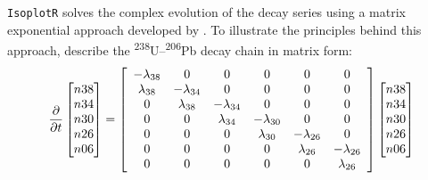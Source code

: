 \begin{refsection}
\texttt{IsoplotR} solves the complex evolution of the decay series
using a matrix exponential approach developed by \citet{mclean2016}.
To illustrate the principles behind this approach, describe the
\textsuperscript{238}U--\textsuperscript{206}Pb decay chain in matrix
form:
\begin{equation}
  \frac{\partial}{\partial{t}}\left[
    \begin{array}{@{}c@{}}
      n38\\
      n34\\
      n30\\
      n26\\
      n06
    \end{array}
  \right]
  =
  \left[
    \begin{array}{cccccc}
      -\lambda_{38} & 0 & 0 & 0 & 0 & 0 \\
      \lambda_{38} & -\lambda_{34} & 0 & 0 & 0 & 0 \\
      0 & \lambda_{38} & -\lambda_{34} & 0 & 0 & 0 \\
      0 & 0 & \lambda_{34} & -\lambda_{30} & 0 & 0 \\
      0 & 0 & 0 & \lambda_{30} & -\lambda_{26} & 0 \\
      0 & 0 & 0 & 0 & \lambda_{26} & -\lambda_{26} \\
      0 & 0 & 0 & 0 & 0 & \lambda_{26}\\
    \end{array}
    \right]
  \left[
    \begin{array}{@{}c@{}}
      n38\\
      n34\\
      n30\\
      n26\\
      n06
    \end{array}
    \right]
  \label{eq:matrixdecay}
\end{equation}


\end{refsection}
